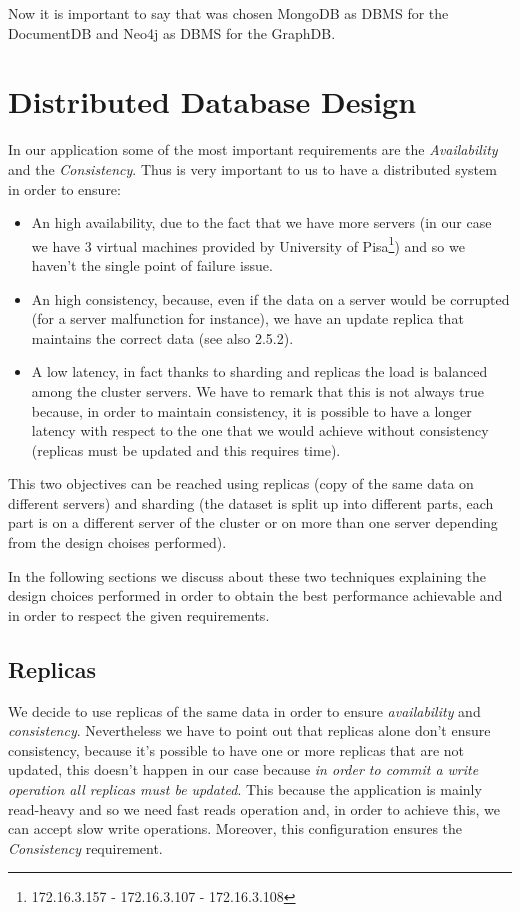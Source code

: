 \documentclass[a4paper]{report}
\begin{document}
\noindent Now it is important to say that was chosen MongoDB as DBMS for the DocumentDB and Neo4j as DBMS for the GraphDB.

\section{Distributed Database Design}
In our application some of the most important requirements are the \emph{Availability} and the \emph{Consistency}. Thus is very important to us to have a distributed system in order to ensure:
\begin{itemize}
	\item An high availability, due to the fact that we have more servers (in our case we have 3 virtual machines provided by University of Pisa\footnote{172.16.3.157 - 172.16.3.107 -  172.16.3.108}) and so we haven't the single point of failure issue.
	\item An high consistency, because, even if the data on a server would be corrupted (for a server malfunction for instance), we have an update replica that maintains the correct data (see also 2.5.2).
	\item A low latency, in fact thanks to sharding and replicas the load is balanced among the cluster servers. We have to remark that this is not always true because, in order to maintain consistency, it is possible to have a longer latency with respect to the one that we would achieve without consistency (replicas must be updated and this requires time).
\end{itemize}

\noindent This two objectives can be reached using replicas (copy of the same data on different servers) and sharding (the dataset is split up into different parts, each part is on a different server of the cluster or on more than one server depending from the design choises performed).

\noindent In the following sections we discuss about these two techniques explaining the design choices performed in order to obtain the best performance achievable and in order to respect the given requirements. 



\subsection{Replicas}
We decide to use replicas of the same data in order to ensure \emph{availability} and \emph{consistency}. Nevertheless we have to point out that replicas alone don't ensure consistency, because it's possible to have one or more replicas that are not updated, this doesn't happen in our case because \emph{in order to commit a write operation all replicas must be updated}. This because the application is mainly read-heavy and so we need fast reads operation and, in order to achieve this, we can accept slow write operations. Moreover, this configuration ensures the \emph{Consistency} requirement.
\end{document}

